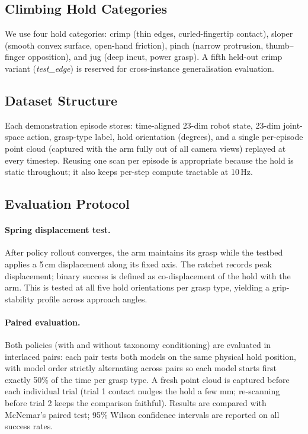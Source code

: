 \documentclass[11pt]{article}
\begin{document}
\subsection{Climbing Hold Categories}
We use four hold categories: crimp (thin edges, curled-fingertip contact), sloper
(smooth convex surface, open-hand friction), pinch (narrow protrusion, thumb--finger
opposition), and jug (deep incut, power grasp). A fifth held-out crimp variant
(\textit{test\_edge}) is reserved for cross-instance generalisation evaluation.

\subsection{Dataset Structure}
Each demonstration episode stores: time-aligned 23-dim robot state, 23-dim joint-space
action, grasp-type label, hold orientation (degrees), and a single per-episode point
cloud (captured with the arm fully out of all camera views) replayed at every timestep.
Reusing one scan per episode is appropriate because the hold is static throughout;
it also keeps per-step compute tractable at 10\,Hz.

\subsection{Evaluation Protocol}
\paragraph{Spring displacement test.}
After policy rollout converges, the arm maintains its grasp while the testbed applies a
5\,cm displacement along its fixed axis. The ratchet records peak displacement; binary
success is defined as co-displacement of the hold with the arm. This is tested at all
five hold orientations per grasp type, yielding a grip-stability profile across approach
angles.

\paragraph{Paired evaluation.}
Both policies (with and without taxonomy conditioning) are evaluated in interlaced pairs:
each pair tests both models on the same physical hold position, with model order strictly
alternating across pairs so each model starts first exactly 50\% of the time per grasp
type. A fresh point cloud is captured before each individual trial (trial 1 contact
nudges the hold a few mm; re-scanning before trial 2 keeps the comparison faithful).
Results are compared with McNemar's paired test; 95\% Wilson confidence intervals are
reported on all success rates.
\end{document}
